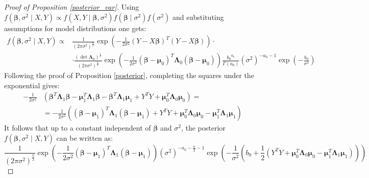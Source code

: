 \documentclass[10pt,fleqn]{amsart}
\theoremstyle{definition}
\theoremstyle{remark}
\numberwithin{equation}{section}
\newcommand{\bbeta}{\boldsymbol{\beta}}
\newcommand{\mmu}{\boldsymbol{\mu}}
\newcommand{\LLambda}{\boldsymbol{\Lambda}}
\begin{document}
\begin{proof}[Proof of Proposition \ref{posterior_var}]
Using $f(\bbeta, \sigma^2\mid X, Y)\propto f(X, Y\mid \bbeta, \sigma^2)f(\bbeta\mid\sigma^2)f(\sigma^2)$ and
substituting assumptions for model distributions one gets:
\begin{equation*}\begin{split}
    f(\bbeta,\sigma^2\mid X, Y)\propto&\frac 1 {\left(2\pi\sigma^2\right)^{\frac n 2}}
    \exp\left(-\frac 1{2\sigma^2}\left(Y-X\bbeta\right)^T\left(Y-X\bbeta\right)\right)\cdot\\
    &\cdot\frac{\left(\det\LLambda_0\right)^{\frac 12}}{\left(2\pi\sigma^2\right)^{\frac{k}2}}
    \exp\left(-\frac 1{2\sigma^2}(\bbeta-\mmu_0)^T\LLambda_0(\bbeta-\mmu_0)\right)
    \frac{{b_0}^{a_0}}{\Gamma(a_0)}\left(\sigma^2\right)^{-a_0-1}\exp\left(-\frac{b_0}{\sigma^2}\right)
\end{split}\end{equation*}
Following the proof of Proposition \ref{posterior}, completing the squares under the exponential gives:
\begin{equation*}\begin{split}
    -\frac 1{2\sigma^2}&\left(\bbeta^T\LLambda_1\bbeta-\mmu_1^T\LLambda_1\bbeta-\bbeta^T\LLambda_1\mmu_1+Y^TY+\mmu_0^T\LLambda_0\mmu_0\right)=\\
    &=-\frac 1{2\sigma^2}\left((\bbeta-\mmu_1)^T\LLambda_1(\bbeta-\mmu_1)+Y^TY+\mmu_0^T\LLambda_0\mmu_0-\mmu_1^T\LLambda_1\mmu_1\right)
\end{split}\end{equation*}
It follows that up to a constant independent of $\bbeta$ and $\sigma^2$, the posterior $f(\bbeta,\sigma^2\mid X, Y)$ can be written as:
\begin{equation*}
    \frac 1{\left(2\pi\sigma^2\right)^{\frac{k}2}}
    \exp\left(-\frac 1{2\sigma^2}(\bbeta-\mmu_1)^T\LLambda_1(\bbeta-\mmu_1)\right)
    \left(\sigma^2\right)^{-a_0-\frac n 2 -1}\exp\left(-\frac{1}{\sigma^2}\left(b_0+\frac 12 
    \left(Y^TY+\mmu_0^T\LLambda_0\mmu_0-\mmu_1^T\LLambda_1\mmu_1\right)
    \right)\right)
\end{equation*}
\end{proof}
\end{document}
